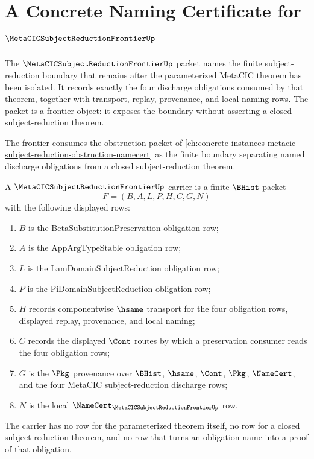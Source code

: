 \chapter{A Concrete Naming Certificate for $\MetaCICSubjectReductionFrontierUp$}
\label{ch:concrete-instances-metacic-subject-reduction-frontier-namecert}

The $\MetaCICSubjectReductionFrontierUp$ packet names the finite subject-reduction boundary that remains after the parameterized MetaCIC theorem has been isolated. It records exactly the four discharge obligations consumed by that theorem, together with transport, replay, provenance, and local naming rows. The packet is a frontier object: it exposes the boundary without asserting a closed subject-reduction theorem.

The frontier consumes the obstruction packet of \autoref{ch:concrete-instances-metacic-subject-reduction-obstruction-namecert} as the finite boundary separating named discharge obligations from a closed subject-reduction theorem.

\begin{definition}
\label{def:metacic-subject-reduction-frontier-carrier}
A $\MetaCICSubjectReductionFrontierUp$ carrier is a finite $\BHist$ packet
$$
F=(B,A,L,P,H,C,G,N)
$$
with the following displayed rows:
\begin{enumerate}
\item $B$ is the $\mathrm{BetaSubstitutionPreservation}$ obligation row;
\item $A$ is the $\mathrm{AppArgTypeStable}$ obligation row;
\item $L$ is the $\mathrm{LamDomainSubjectReduction}$ obligation row;
\item $P$ is the $\mathrm{PiDomainSubjectReduction}$ obligation row;
\item $H$ records componentwise $\hsame$ transport for the four obligation rows, displayed replay, provenance, and local naming;
\item $C$ records the displayed $\Cont$ routes by which a preservation consumer reads the four obligation rows;
\item $G$ is the $\Pkg$ provenance over $\BHist$, $\hsame$, $\Cont$, $\Pkg$, $\NameCert$, and the four MetaCIC subject-reduction discharge rows;
\item $N$ is the local $\NameCert_{\MetaCICSubjectReductionFrontierUp}$ row.
\end{enumerate}
The carrier has no row for the parameterized theorem itself, no row for a closed subject-reduction theorem, and no row that turns an obligation name into a proof of that obligation.
\end{definition}

